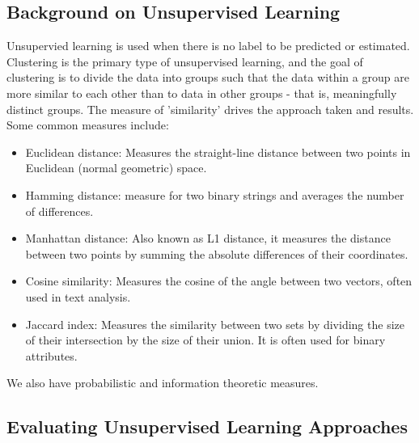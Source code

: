 \documentclass[11pt]{article}
\begin{document}
\subsection{Background on Unsupervised Learning}

Unsupervied learning is used when there is no label to be predicted or estimated.
Clustering is the primary type of unsupervised learning, and the goal of clustering is to divide the data into groups such that the data within a group are more similar to each other than to data in other groups - that is, meaningfully distinct groups. 
The measure of 'similarity' drives the approach taken and results. Some common measures include:

\begin{itemize}
    \item Euclidean distance: Measures the straight-line distance between two points in Euclidean (normal geometric) space.
    \item Hamming distance: measure for two binary strings and averages the number of differences.
    \item Manhattan distance: Also known as L1 distance, it measures the distance between two points by summing the absolute differences of their coordinates.
    \item Cosine similarity: Measures the cosine of the angle between two vectors, often used in text analysis.
    \item Jaccard index: Measures the similarity between two sets by dividing the size of their intersection by the size of their union. It is often used for binary attributes.
\end{itemize}

We also have probabilistic and information theoretic measures.

\subsection{Evaluating Unsupervised Learning Approaches}
\end{document}
